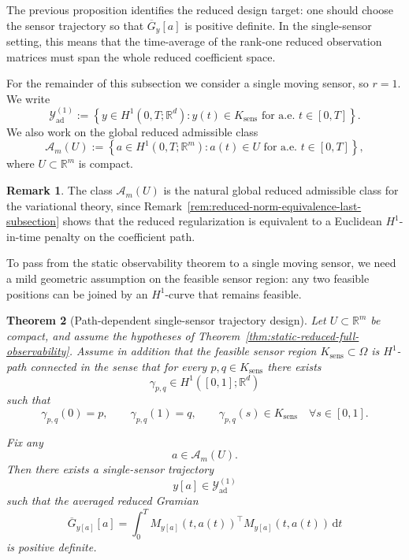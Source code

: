 \documentclass{article}
\newtheorem{theorem}{Theorem}[section]
\theoremstyle{definition}
\newtheorem{remark}[theorem]{Remark}
\renewcommand{\d}{\mathrm{d}}
\begin{document}
The previous proposition identifies the reduced design target: one should choose the sensor
trajectory so that \(\overline G_y[a]\) is positive definite. In the single-sensor setting, this means
that the time-average of the rank-one reduced observation matrices must span the whole reduced
coefficient space.

For the remainder of this subsection we consider a single moving sensor, so \(r=1\). We write
\[
    \mathcal Y_{\mathrm{ad}}^{(1)}
    :=
    \left\{
    y\in H^1(0,T;\mathbb R^d):
    y(t)\in K_{\mathrm{sens}}
    \text{ for a.e.\ }t\in[0,T]
    \right\}.
\]
We also work on the global reduced admissible class
\[
    \mathcal A_m(U)
    :=
    \left\{
    a\in H^1(0,T;\mathbb R^m):
    a(t)\in U
    \text{ for a.e.\ }t\in[0,T]
    \right\},
\]
where \(U\subset \mathbb R^m\) is compact.

\begin{remark}
    \label{rem:global-reduced-class-natural}
    The class \(\mathcal A_m(U)\) is the natural global reduced admissible class for the variational
    theory, since Remark~\ref{rem:reduced-norm-equivalence-last-subsection} shows that the reduced
    regularization is equivalent to a Euclidean \(H^1\)-in-time penalty on the coefficient path.
\end{remark}

To pass from the static observability theorem to a single moving sensor, we need a mild geometric
assumption on the feasible sensor region: any two feasible positions can be joined by an
\(H^1\)-curve that remains feasible.

\begin{theorem}[Path-dependent single-sensor trajectory design]
    \label{thm:path-dependent-mobile-design}
    Let \(U\subset\mathbb R^m\) be compact, and assume the hypotheses of
    Theorem~\ref{thm:static-reduced-full-observability}. Assume in addition that the feasible sensor
    region \(K_{\mathrm{sens}}\subset \Omega\) is \(H^1\)-path connected in the sense that for every
    \(p,q\in K_{\mathrm{sens}}\) there exists
    \[
        \gamma_{p,q}\in H^1([0,1];\mathbb R^d)
    \]
    such that
    \[
        \gamma_{p,q}(0)=p,\qquad
        \gamma_{p,q}(1)=q,\qquad
        \gamma_{p,q}(s)\in K_{\mathrm{sens}}
        \quad\forall s\in[0,1].
    \]

    Fix any
    \[
        a\in \mathcal A_m(U).
    \]
    Then there exists a single-sensor trajectory
    \[
        y[a]\in \mathcal Y_{\mathrm{ad}}^{(1)}
    \]
    such that the averaged reduced Gramian
    \[
        \overline G_{y[a]}[a]
        =
        \int_0^T M_{y[a]}(t,a(t))^\top M_{y[a]}(t,a(t))\,\d t
    \]
    is positive definite.
\end{theorem}
\end{document}
